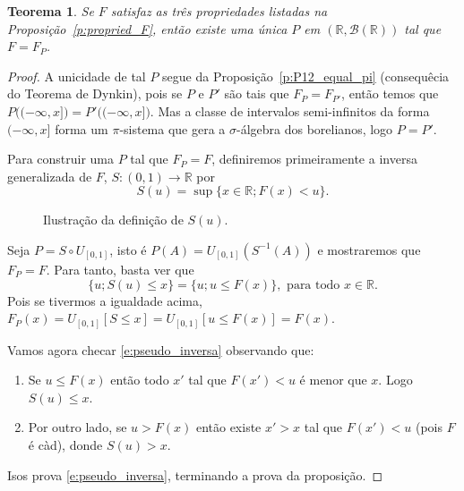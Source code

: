 \documentclass[reqno]{article}
\newcommand*\1{\mathds{1}}
\newtheorem{theorem}{Teorema}[section]
\begin{document}
\begin{theorem}
  Se $F$ satisfaz as três propriedades listadas na Proposição~\ref{p:propried_F}, então existe uma única $P$ em $(\mathbb{R}, \mathcal{B}(\mathbb{R}))$ tal que $F = F_P$.
\end{theorem}

\begin{proof}
  A unicidade de tal $P$ segue da Proposição~\ref{p:P12_equal_pi} (consequêcia do Teorema de Dynkin), pois se $P$ e $P'$ são tais que $F_{P} = F_{P'}$, então temos que $P\big( (-\infty, x] \big) = P'\big( (-\infty, x] \big)$.
  Mas a classe de intervalos semi-infinitos da forma $(-\infty, x]$ forma um $\pi$-sistema que gera a $\sigma$-álgebra dos borelianos, logo $P = P'$.

  Para construir uma $P$ tal que $F_P = F$, definiremos primeiramente a inversa generalizada de $F$, $S:(0,1) \to \mathbb{R}$ por
  \begin{equation}
    S(u) = \sup \{x \in \mathbb{R}; F(x) < u\}.
  \end{equation}
\begin{figure}[htbp]
\centering
{}
\caption{\small Ilustração da definição de $S(u)$.}
\label{f:Rk_good}
\end{figure}

Seja $P = S \circ U_{[0,1]}$, isto é $P(A) = U_{[0,1]}(S^{-1}(A))$ e mostraremos que $F_P = F$.
Para tanto, basta ver que
\begin{equation}
  \label{e:pseudo_inversa}
  \{u; S(u) \leq x\} = \{u; u \leq F(x)\}, \text{ para todo $x \in \mathbb{R}$}.
\end{equation}
Pois se tivermos a igualdade acima, $F_P(x) = U_{[0,1]}[S \leq x] = U_{[0,1]} [u \leq F(x)] = F(x)$.

Vamos agora checar \eqref{e:pseudo_inversa} observando que:
\begin{enumerate}
\item Se $u \leq F(x)$ então todo $x'$ tal que $F(x') < u$ é menor que $x$.
  Logo $S(u) \leq x$.
\item Por outro lado, se $u > F(x)$ então existe $x' > x$ tal que $F(x') < u$ (pois $F$ é càd), donde $S(u) > x$.
\end{enumerate}
Isos prova \eqref{e:pseudo_inversa}, terminando a prova da proposição.
\end{proof}
\end{document}
